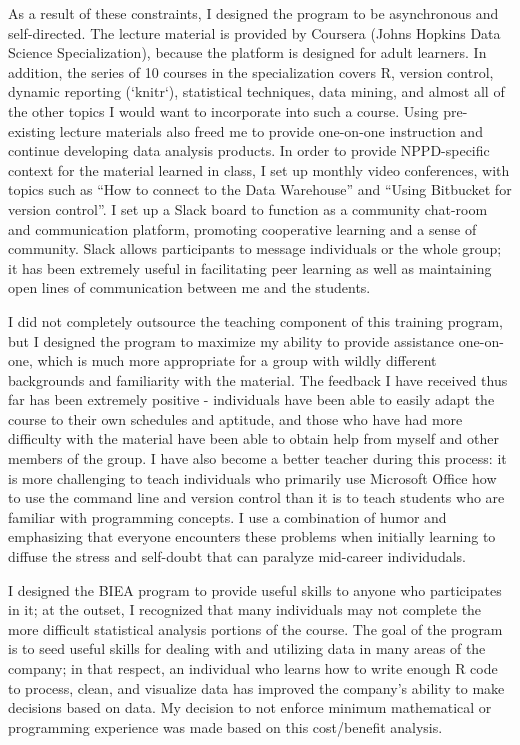\documentclass[12pt, letterpaper, sans]{moderncv}
\begin{document}
As a result of these constraints, I designed the program to be asynchronous and self-directed. The lecture material is provided by Coursera (Johns Hopkins Data Science Specialization), because the platform is designed for adult learners. In addition, the series of 10 courses in the specialization covers R, version control, dynamic reporting (`knitr`), statistical techniques, data mining, and almost all of the other topics I would want to incorporate into such a course. Using pre-existing lecture materials also freed me to provide one-on-one instruction and continue developing data analysis products. In order to provide NPPD-specific context for the material learned in class, I set up monthly video conferences, with topics such as ``How to connect to the Data Warehouse'' and ``Using Bitbucket for version control''. I set up a Slack board to function as a community chat-room and communication platform, promoting cooperative learning and a sense of community. Slack allows participants to message individuals or the whole group; it has been extremely useful in facilitating peer learning as well as maintaining open lines of communication between me and the students. 

I did not completely outsource the teaching component of this training program, but I designed the program to maximize my ability to provide assistance one-on-one, which is much more appropriate for a group with wildly different backgrounds and familiarity with the material. The feedback I have received thus far has been extremely positive - individuals have been able to easily adapt the course to their own schedules and aptitude, and those who have had more difficulty with the material have been able to obtain help from myself and other members of the group. I have also become a better teacher during this process: it is more challenging to teach individuals who primarily use Microsoft Office how to use the command line and version control than it is to teach students who are familiar with programming concepts. I use a combination of humor and emphasizing that everyone encounters these problems when initially learning to diffuse the stress and self-doubt that can paralyze mid-career individudals. 

I designed the BIEA program to provide useful skills to anyone who participates in it; at the outset, I recognized that many individuals may not complete the more difficult statistical analysis portions of the course. The goal of the program is to seed useful skills for dealing with and utilizing data in many areas of the company; in that respect, an individual who learns how to write enough R code to process, clean, and visualize data has improved the company's ability to make decisions based on data. My decision to not enforce minimum mathematical or programming experience was made based on this cost/benefit analysis. 
\end{document}
